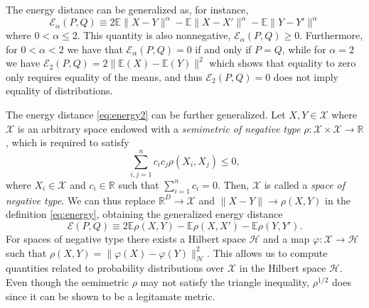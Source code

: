 \documentclass[aps,preprint,nofootinbib,floatfix]{revtex4-1}
\newcommand\Energy{\mathcal{E}}
\newcommand\E{\mathbb{E}}
\begin{document}
The energy distance can be generalized as, for instance,
\begin{equation}
\label{eq:energy2}
\Energy_\alpha(P, Q) \equiv 
2 \E \| X - Y\|^{\alpha} - \E \| X - X' \|^{\alpha} - 
\E \| Y - Y' \|^{\alpha}
\end{equation}
where $0<\alpha\le 2$. This quantity is also nonnegative,
$\Energy_\alpha(P,Q) \ge 0$. Furthermore, for $0<\alpha<2$ we have that
$\Energy_\alpha(P,Q) = 0$ if and only if $P=Q$, while for $\alpha=2$ 
we have $\Energy_2(P,Q) = 2\| \E(X) - \E(Y) \|^2$ which shows that
equality to zero only requires
equality of the means, and thus $\Energy_2(P,Q)=0$ does 
not imply equality of distributions.

The energy distance \eqref{eq:energy2} can be further generalized.
Let $X, Y \in \mathcal{X}$  where $\mathcal{X}$ is an arbitrary space endowed
with a \emph{semimetric of negative type}
$\rho: \mathcal{X}\times\mathcal{X} \to \mathbb{R}$, which is required
to satisfy
\begin{equation}
\label{eq:negative_type}
\sum_{i,j=1}^n c_i c_j \rho(X_i, X_j) \le 0,
\end{equation}
where $X_i \in \mathcal{X}$ and $c_i \in \mathbb{R}$ such that
$\sum_{i=1}^n c_i = 0$. Then, $\mathcal{X}$ is called a \emph{space of
negative type}.
We can thus replace $\mathbb{R}^D \to \mathcal{X}$ and 
$\| X - Y \| \to \rho(X , Y)$ in the definition \eqref{eq:energy}, obtaining
the generalized energy distance
\begin{equation}
\label{eq:energy3}
\Energy(P, Q) \equiv 2 \E \rho(X,Y) - \E \rho(X, X') - \E \rho(Y,Y').
\end{equation}
For spaces of negative type there exists a Hilbert space $\mathcal{H}$ and
a map $\varphi: \mathcal{X} \to
\mathcal{H}$ such that
$\rho(X, Y) = \| \varphi(X) - \varphi(Y) \|_{\mathcal{H}}^2$. This
allows us to compute quantities related to probability distributions over
$\mathcal{X}$ in the Hilbert space $\mathcal{H}$.
Even though the semimetric 
$\rho$ may not satisfy the triangle inequality, 
$\rho^{1/2}$ does since it can be shown to be a legitamate metric. 
\end{document}
